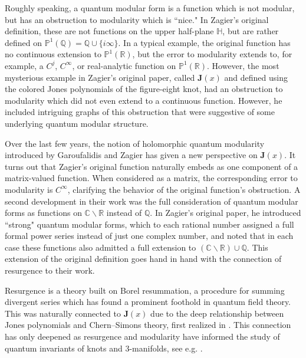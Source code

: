 \documentclass[12pt]{amsart}
\theoremstyle{definition}
\theoremstyle{plain}
\numberwithin{equation}{section}
\begin{document}
Roughly speaking, a quantum modular form is a function which is not modular, but has an obstruction to modularity which is ``nice." In Zagier's original definition, these are not functions on the upper half-plane $\mathbb{H}$, but are rather defined on $\mathbb{P}^1(\mathbb{Q}) = \mathbb{Q} \cup \{i\infty\}$. In a typical example, the original function has no continuous extension to $\mathbb{P}^1(\mathbb{R})$, but the error to modularity extends to, for example, a $C^j$, $C^\infty$, or real-analytic function on $\mathbb{P}^1(\mathbb{R})$. However, the most mysterious example in Zagier's original paper, called $\mathbf{J}(x)$ and defined using the colored Jones polynomials of the figure-eight knot, had an obstruction to modularity which did not even extend to a continuous function. However, he included intriguing graphs of this obstruction that were suggestive of some underlying quantum modular structure.  

Over the last few years, the notion of holomorphic quantum modularity introduced by Garoufalidis and Zagier \cite{g-z-23, g-z-24} has given a new perspective on $\mathbf{J}(x)$. It turns out that Zagier's original function naturally embeds as one component of a matrix-valued function. When considered as a matrix, the corresponding error to modularity is $C^\infty$, clarifying the behavior of the original function's obstruction. 
A second development in their work was the full consideration of quantum modular forms as functions on $\mathbb{C}\backslash \mathbb{R}$ instead of $\mathbb{Q}$. In Zagier's original paper, he introduced ``strong" quantum modular forms, which to each rational number assigned a full formal power series instead of just one complex number, and noted that in each case these functions also admitted a full extension to $(\mathbb{C}\backslash \mathbb{R}) \cup \mathbb{Q}$.  This extension of the original definition goes hand in hand with the connection of resurgence to their work. 
 
Resurgence is a theory built on Borel resummation, a procedure for summing divergent series which has found a prominent foothold in quantum field theory. This was naturally connected to $\mathbf{J}(x)$ due to the deep relationship between Jones polynomials and Chern--Simons theory, first realized in \cite{witten}. This connection has only deepened as resurgence and modularity have informed the study of quantum invariants of knots and 3-manifolds, see e.g. \cite{garoufalidis, 3d-modularity, gukov-marino-putrov, andersen-mistegard}.
\end{document}
